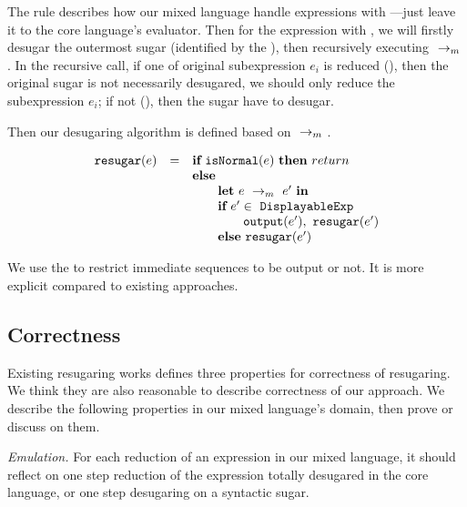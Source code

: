 {
}

The  rule describes how our mixed language handle expressions with ---just leave it to the core language's evaluator. Then for the expression with , we will firstly desugar the outermost sugar (identified by the ), then recursively executing $~\rightarrow_m~$. In the recursive call, if one of original subexpression $e_i$ is reduced (), then the original sugar is not necessarily desugared, we should only reduce the subexpression $e_i$; if not (), then the sugar have to desugar.


Then our desugaring algorithm is defined based on $~\rightarrow_m~$.

\[
\begin{array}{llll}
\mbox{\tt resugar} (e) &=& \mbox{\rm \bf if}~\mbox{\tt isNormal}(e)~\mbox{\rm \bf then}~return\\
              & & \mbox{\rm \bf else}~\\
							& & \qquad \mbox{\rm \bf let}~e ~\rightarrow_m~e'~\mbox{\rm \bf in}\\
							& & \qquad \mbox{\rm \bf if}~e' \in~\mbox{\tt DisplayableExp} \\
							& & \qquad \qquad \mbox{\tt output}(e'),~\mbox{\tt resugar}(e')\\
							& & \qquad \mbox{\rm \bf else}~\mbox{\tt resugar}(e')
\end{array}
\]

We use the  to restrict immediate sequences to be output or not. It is more explicit compared to existing approaches.

\subsection{Correctness}

Existing resugaring works\cite{resugaring,hygienic} defines three properties for correctness of resugaring. We think they are also reasonable to describe correctness of our approach. We describe the following properties in our mixed language's domain, then prove or discuss on them.

\emph{Emulation.} For each reduction of an expression in our mixed language, it should reflect on one step reduction of the expression totally desugared in the core language, or one step desugaring on a syntactic sugar.

